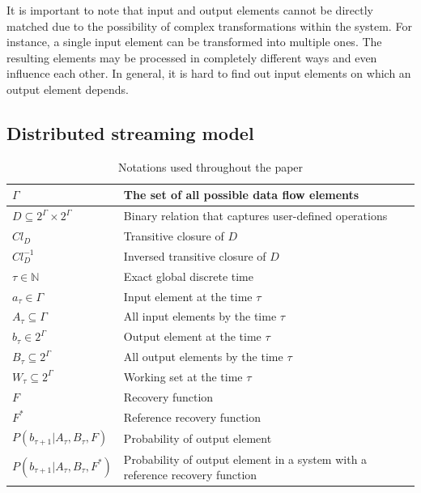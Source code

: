 It is important to note that input and output elements cannot be directly matched due to the possibility of complex transformations within the system. 
For instance, a single input element can be transformed into multiple ones.  The resulting elements may be processed in completely different ways and even influence each other. 
In general, it is hard to find out input elements on which an output element depends. 

\subsection{Distributed streaming model}

\begin{table}[!b]
    \caption{Notations used throughout the paper}
    \begin{tabular}{l|p{5cm}}
        \hline
        $\Gamma$ & The set of all possible data flow elements \\ 
        \hline
        $D\subseteq{2^{\Gamma}\times2^{\Gamma}}$ & Binary relation that captures user-defined operations  \\
        \hline
        $Cl_D$ & Transitive closure of $D$  \\
        \hline
        $Cl^{-1}_D$ & Inversed transitive closure of $D$  \\
        \hline
        $\tau \in \mathbb{N}$ & Exact global discrete time \\
        \hline
        $a_\tau \in \Gamma$ & Input element at the time $\tau$ \\
        \hline
        $A_\tau \subseteq \Gamma$ & All input elements by the time $\tau$ \\
        \hline
        $b_\tau \in 2^{\Gamma}$ & Output element at the time $\tau$ \\
        \hline
        $B_\tau \subseteq 2^{\Gamma}$ & All output elements by the time $\tau$ \\
        \hline
        $W_\tau \subseteq 2^{\Gamma}$ & Working set at the time $\tau$ \\
        \hline
        $F$ & Recovery function \\
        \hline
        $F^{*}$ & Reference recovery function \\
        \hline
        $P(b_{\tau+1}|A_{\tau}, B_\tau, F)$ & Probability of output element \\
        \hline
        $P(b_{\tau+1}|A_{\tau}, B_\tau, F^{*})$ & Probability of output element in a system with a reference recovery function \\
    \end{tabular}
    \label{notations}
\end{table}

